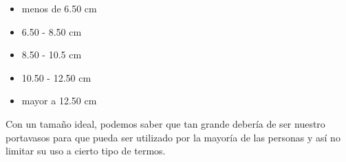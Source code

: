 
\begin{itemize}
    \item menos de 6.50 cm
    \item 6.50 - 8.50 cm
    \item 8.50 - 10.5 cm
    \item 10.50 - 12.50 cm
    \item mayor a 12.50 cm
\end{itemize}

Con un tamaño ideal, podemos saber que tan grande debería de ser nuestro portavasos para que pueda ser utilizado por la mayoría de las personas y así no limitar su uso a cierto tipo de termos.